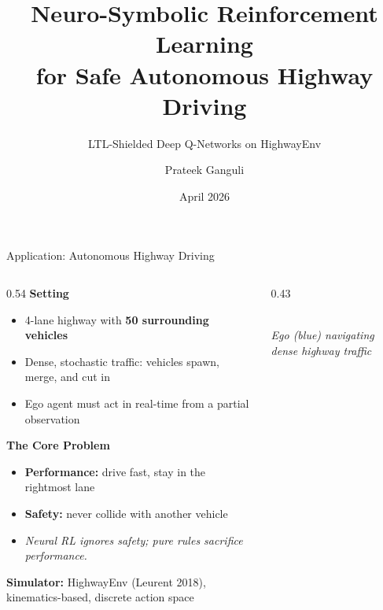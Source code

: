 \documentclass[aspectratio=169,10pt]{beamer}
\title[Neuro-Symbolic Safe Highway Driving]{%
  \textbf{Neuro-Symbolic Reinforcement Learning}\\
for Safe Autonomous Highway Driving}
\subtitle{LTL-Shielded Deep Q-Networks on HighwayEnv}
\author{Prateek Ganguli}
\date{April 2026}
\begin{document}
\begin{frame}
  \titlepage
\end{frame}


\begin{frame}{Application: Autonomous Highway Driving}
  \begin{columns}[T]
    \begin{column}{0.54\textwidth}
      \textbf{Setting}
      \begin{itemize}[<+->]
        \item 4-lane highway with \textbf{50 surrounding vehicles}
        \item Dense, stochastic traffic: vehicles spawn, merge, and cut in
        \item Ego agent must act in real-time from a partial observation
      \end{itemize}

      \pause\vspace{8pt}
      \textbf{The Core Problem}
      \begin{itemize}[<+->]
        \item \textcolor{neuralblue}{\textbf{Performance:}} drive fast, stay in the rightmost lane
        \item \textcolor{alertred}{\textbf{Safety:}} never collide with another vehicle
        \item \textit{Neural RL ignores safety; pure rules sacrifice performance.}
      \end{itemize}

      \pause\vspace{8pt}
      {\small\textbf{Simulator:} HighwayEnv (Leurent 2018),
      kinematics-based, discrete action space}
    \end{column}
    \begin{column}{0.43\textwidth}
      \\[4pt]
      {\footnotesize\textit{Ego (blue) navigating dense highway traffic}}
    \end{column}
  \end{columns}
\end{frame}
\end{document}
